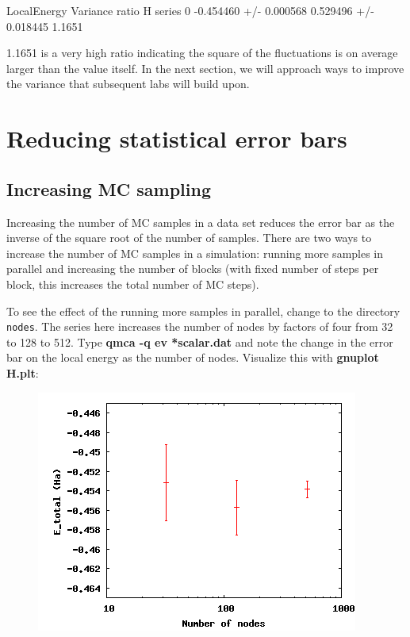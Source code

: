 \begin{shade}
                     LocalEnergy               Variance        ratio
H  series 0  -0.454460 +/- 0.000568   0.529496 +/- 0.018445   1.1651
\end{shade}

1.1651 is a very high ratio indicating the square of the fluctuations is on
average larger than the value itself.  In the next section, we will approach
ways to improve the variance that subsequent labs will build upon.  

\section{Reducing statistical error bars}

\subsection{Increasing MC sampling}

Increasing the number of MC samples in a data set reduces the error bar as the
inverse of the square root of the number of samples.  There are two ways to
increase the number of MC samples in a simulation: running more samples in
parallel and increasing the number of blocks (with fixed number of steps per
block, this increases the total number of MC steps).

To see the effect of the running more samples in parallel, change to the
directory \texttt{nodes}.  The series here increases the number of nodes by
factors of four from 32 to 128 to 512.  Type \textbf{qmca -q ev *scalar.dat}
and note the change in the error bar on the local energy as the number of
nodes.  Visualize this with \textbf{gnuplot H.plt}:

\FloatBarrier
\begin{figure}[ht!]
\begin{center}
\includegraphics[trim = 0mm 0mm 0mm 0mm, clip,width=0.75\columnwidth]{figures/lab_qmc_statistics_nodes.png}
\end{center}
\end{figure}
\FloatBarrier

